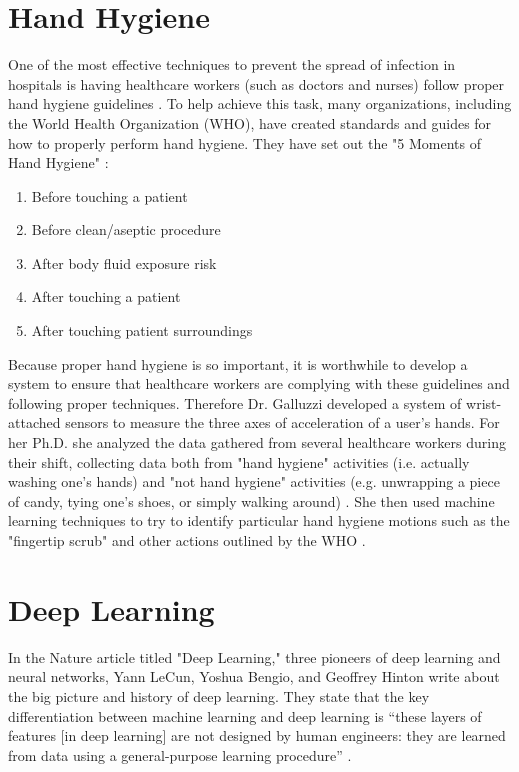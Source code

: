 \documentclass[]{report}
\begin{document}
\section{Hand Hygiene}

One of the most effective techniques to prevent the spread of infection in hospitals is having healthcare workers (such as doctors and nurses) follow proper hand hygiene guidelines \cite{Galluzzi}. To help achieve this task, many organizations, including the World Health Organization (WHO), have created standards and guides for how to properly perform hand hygiene. They have set out the "5 Moments of Hand Hygiene" \cite{WHO}:
\begin{enumerate}
	\item Before touching a patient
	\item Before clean/aseptic procedure
	\item After body fluid exposure risk
	\item After touching a patient
	\item After touching patient surroundings
\end{enumerate}

Because proper hand hygiene is so important, it is worthwhile to develop a system to ensure that healthcare workers are complying with these guidelines and following proper techniques. Therefore Dr. Galluzzi developed a system of wrist-attached sensors to measure the three axes of acceleration of a user's hands. For her Ph.D. she analyzed the data gathered from several healthcare workers during their shift, collecting data both from "hand hygiene" activities (i.e. actually washing one's hands) and "not hand hygiene" activities (e.g. unwrapping a piece of candy, tying one's shoes, or simply walking around) \cite{Galluzzi}. She then used machine learning techniques to try to identify particular hand hygiene motions such as the "fingertip scrub" and other actions outlined by the WHO \cite{Galluzzi}.

\section{Deep Learning}



In the Nature article titled "Deep Learning," three pioneers of deep learning and neural networks, Yann LeCun, Yoshua Bengio, and Geoffrey Hinton write about the big picture and history of deep learning. They state that the key differentiation between machine learning and deep learning is ``these layers of features [in deep learning] are not designed by human engineers: they are learned from data using a general-purpose learning procedure'' \cite{ThreeGiants}. 
\end{document}
